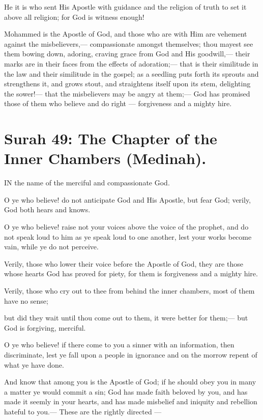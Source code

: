 \documentclass[fontsize=14pt, letterpaper, notitlepage, openany, DIV=12]{scrbook} %
\begin{document}
\noindent[48:28]
He it is who sent His Apostle with guidance and the religion of truth to set it above all
religion; for God is witness enough!

\noindent[48:29]
Mohammed is the Apostle of God, and those who are with Him are vehement against the
misbelievers,--- compassionate amongst themselves; thou mayest see them bowing down,
adoring, craving grace from God and His goodwill,--- their marks are in their faces from the
effects of adoration;--- that is their similitude in the law and their similitude in the gospel; as a
seedling puts forth its sprouts and strengthens it, and grows stout, and straightens itself upon its
stem, delighting the sower!--- that the misbelievers may be angry at them;--- God has promised
those of them who believe and do right --- forgiveness and a mighty hire.


\section{Surah 49: The Chapter of the Inner Chambers (Medinah).}


IN the name of the merciful and compassionate God.

\noindent[49:1]
O ye who believe! do not anticipate God and His Apostle, but fear God; verily, God both
hears and knows.

\noindent[49:2]
O ye who believe! raise not your voices above the voice of the prophet, and do not speak
loud to him as ye speak loud to one another, lest your works become vain, while ye do not
perceive.

\noindent[49:3]
Verily, those who lower their voice before the Apostle of God, they are those whose
hearts God has proved for piety, for them is forgiveness and a mighty hire.

\noindent[49:4]
Verily, those who cry out to thee from behind the inner chambers, most of them have no
sense;

\noindent[49:5]
but did they wait until thou come out to them, it were better for them;--- but God is
forgiving, merciful.

\noindent[49:6]
O ye who believe! if there come to you a sinner with an information, then discriminate,
lest ye fall upon a people in ignorance and on the morrow repent of what ye have done.

\noindent[49:7]
And know that among you is the Apostle of God; if he should obey you in many a matter
ye would commit a sin; God has made faith beloved by you, and has made it seemly in your
hearts, and has made misbelief and iniquity and rebellion hateful to you.--- These are the rightly
directed ---
\end{document}
